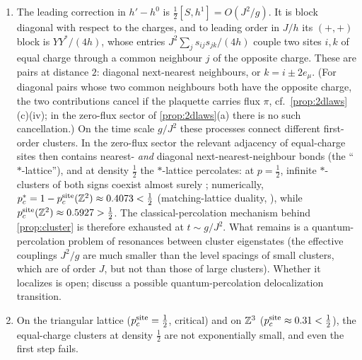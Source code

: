 \begin{remark}\label{rem:clusterstop}
\leavevmode
\begin{enumerate}[label=(\alph*)]
\item The leading correction in $h'-h^0$ is $\frac12[S,h^1]=O(J^2/g)$.  It is block diagonal with respect to the
charges, and to leading order in $J/h$ its $(+,+)$ block is $YY^*/(4h)$, whose entries $J^2\sum_js_{ij}s_{jk}/(4h)$
couple two sites $i,k$ of equal charge through a common neighbour $j$ of the opposite charge.  These are pairs at
distance $2$: diagonal next-nearest neighbours, or $k=i\pm2e_\mu$.  (For diagonal pairs whose two common neighbours
both have the opposite charge, the two contributions cancel if the plaquette carries flux $\pi$, cf.\
\cref{prop:2dlaws}(c)(iv); in the zero-flux sector of \cref{prop:2dlaws}(a) there is no such cancellation.)  On the time
scale $g/J^2$ these processes connect different first-order clusters.  In the zero-flux sector the relevant
adjacency of equal-charge sites then contains nearest- \emph{and} diagonal next-nearest-neighbour bonds (the
``$*$-lattice''), and at density $\frac12$ the $*$-lattice percolates: at $p=\frac12$, infinite $*$-clusters of both
signs coexist almost surely \cite{Higuchi1982}; numerically,
$p_c^{*}=1-p_c^{\rm site}(\mathbb{Z}^2)\approx0.4073<\frac12$ (matching-lattice duality, \cite{Kesten1982}), while
$p_c^{\rm site}(\mathbb{Z}^2)\approx0.5927>\frac12$.  The classical-percolation mechanism behind \cref{prop:cluster} is therefore
exhausted at $t\sim g/J^2$.  What remains is a quantum-percolation problem of resonances between cluster
eigenstates (the effective couplings $J^2/g$ are much smaller than the level spacings of small clusters, which are of
order $J$, but not than those of large clusters).  Whether it localizes is open; \cite{SKKM2018} discuss a possible quantum-percolation delocalization
transition.
\item On the triangular lattice ($p_c^{\rm site}=\frac12$, critical) and on $\mathbb{Z}^3$ ($p_c^{\rm site}\approx0.31<\frac12$),
the equal-charge clusters at density $\frac12$ are not exponentially small, and even the first step fails.
\end{enumerate}
\end{remark}


